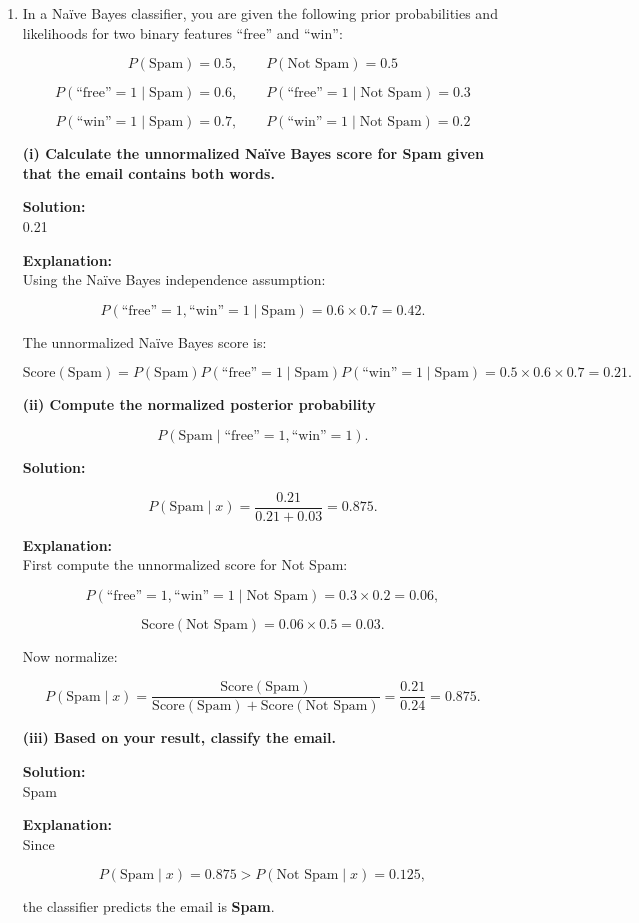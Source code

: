 \documentclass{article}
\begin{document}
\begin{enumerate}
\item In a Na\"ive Bayes classifier, you are given the following prior probabilities and likelihoods for two binary features ``free'' and ``win'':

\[
P(\text{Spam}) = 0.5, \qquad P(\text{Not Spam}) = 0.5
\]

\[
P(\text{``free''}=1 \mid \text{Spam}) = 0.6, \qquad
P(\text{``free''}=1 \mid \text{Not Spam}) = 0.3
\]

\[
P(\text{``win''}=1 \mid \text{Spam}) = 0.7, \qquad
P(\text{``win''}=1 \mid \text{Not Spam}) = 0.2
\]

\textbf{(i) Calculate the unnormalized Na\"ive Bayes score for Spam given that the email contains both words.}

\textbf{Solution:} \\
0.21

\textbf{Explanation:} \\
Using the Na\"ive Bayes independence assumption:

\[
P(\text{``free''}=1,\text{``win''}=1 \mid \text{Spam})
=
0.6 \times 0.7
=
0.42.
\]

The unnormalized Na\"ive Bayes score is:

\[
\text{Score}(\text{Spam})
=
P(\text{Spam})
P(\text{``free''}=1 \mid \text{Spam})
P(\text{``win''}=1 \mid \text{Spam})
=
0.5 \times 0.6 \times 0.7
=
0.21.
\]

\textbf{(ii) Compute the normalized posterior probability}

\[
P(\text{Spam}\mid \text{``free''}=1,\text{``win''}=1).
\]

\textbf{Solution:}

\[
P(\text{Spam}\mid x)
=
\frac{0.21}{0.21+0.03}
=
0.875.
\]

\textbf{Explanation:} \\
First compute the unnormalized score for Not Spam:

\[
P(\text{``free''}=1,\text{``win''}=1 \mid \text{Not Spam})
=
0.3 \times 0.2
=
0.06,
\]

\[
\text{Score}(\text{Not Spam})
=
0.06 \times 0.5
=
0.03.
\]

Now normalize:

\[
P(\text{Spam}\mid x)
=
\frac{\text{Score}(\text{Spam})}
{\text{Score}(\text{Spam})+\text{Score}(\text{Not Spam})}
=
\frac{0.21}{0.24}
=
0.875.
\]

\textbf{(iii) Based on your result, classify the email.}

\textbf{Solution:} \\
Spam

\textbf{Explanation:} \\
Since

\[
P(\text{Spam}\mid x)=0.875
>
P(\text{Not Spam}\mid x)=0.125,
\]

the classifier predicts the email is \textbf{Spam}.

\end{enumerate}
\end{document}
